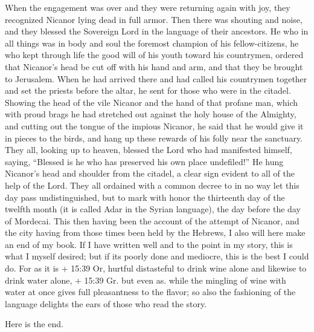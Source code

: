 When the engagement was over and they were returning again
with joy, they recognized Nicanor lying dead in full armor.
 Then there was shouting and noise, and they blessed the
Sovereign Lord in the language of their ancestors.  He who
in all things was in body and soul the foremost champion of his
fellow-citizens, he who kept through life the good will of his youth
toward his countrymen, ordered that Nicanor's head be cut off with his
hand and arm, and that they be brought to Jerusalem.  When
he had arrived there and had called his countrymen together and set the
priests before the altar, he sent for those who were in the citadel.
 Showing the head of the vile Nicanor and the hand of that
profane man, which with proud brags he had stretched out against the
holy house of the Almighty,  and cutting out the tongue of
the impious Nicanor, he said that he would give it in pieces to the
birds, and hang up these rewards of his folly near the sanctuary.
 They all, looking up to heaven, blessed the Lord who had
manifested himself, saying, ``Blessed is he who has preserved his own
place undefiled!''  He hung Nicanor's head and shoulder
from the citadel, a clear sign evident to all of the help of the Lord.
 They all ordained with a common decree to in no way let
this day pass undistinguished, but to mark with honor the thirteenth day
of the twelfth month (it is called Adar in the Syrian language), the day
before the day of Mordecai.  This then having been the
account of the attempt of Nicanor, and the city having from those times
been held by the Hebrews, I also will here make an end of my book.
 If I have written well and to the point in my story, this
is what I myself desired; but if its poorly done and mediocre, this is
the best I could do.  For as it is + 15:39 Or, hurtful
distasteful to drink wine alone and likewise to drink water alone, +
15:39 Gr. but even as. while the mingling of wine with water at once
gives full pleasantness to the flavor; so also the fashioning of the
language delights the ears of those who read the story.

Here is the end.
